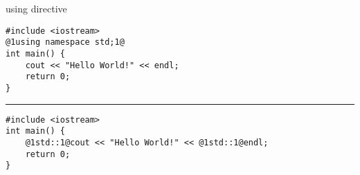 \begin{frame}[fragile,label=using]{using directive}
\begin{lstlisting}
#include <iostream>
@1using namespace std;1@
int main() {
    cout << "Hello World!" << endl;
    return 0;
}
\end{lstlisting}
\hrule
\begin{lstlisting}
#include <iostream>
int main() {
    @1std::1@cout << "Hello World!" << @1std::1@endl;
    return 0;
}
\end{lstlisting}
\end{frame}
